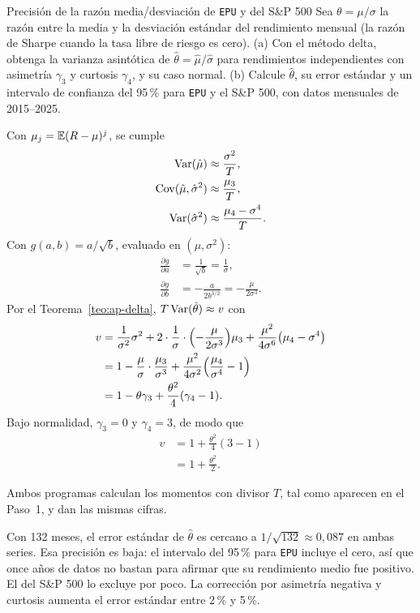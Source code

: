 \begin{ejresuelto}{Precisión de la razón media/desviación de \texttt{EPU} y del S\&P 500}\label{ej:apdelta}
\enunciado Sea $\theta=\mu/\sigma$ la razón entre la media y la desviación estándar del rendimiento
mensual (la razón de Sharpe cuando la tasa libre de riesgo es cero). (a) Con el método delta, obtenga la
varianza asintótica de $\hat\theta=\hat\mu/\hat\sigma$ para rendimientos independientes con asimetría
$\gamma_3$ y curtosis $\gamma_4$, y su caso normal. (b) Calcule $\hat\theta$, su error estándar y un
intervalo de confianza del 95\,\% para \texttt{EPU} y el S\&P 500, con datos mensuales de 2015--2025.

\solucion
{} Con $\mu_j=\mathbb{E}(R-\mu)^j$, se cumple
\begin{align*}
  \operatorname{Var}(\hat\mu)          &\approx \frac{\sigma^2}{T},\\
  \operatorname{Cov}(\hat\mu,\hat\sigma^2) &\approx \frac{\mu_3}{T},\\
  \operatorname{Var}(\hat\sigma^2)     &\approx \frac{\mu_4-\sigma^4}{T}.
\end{align*}
 Con $g(a,b)=a/\sqrt b$, evaluado en $(\mu,\sigma^2)$:
\begin{align*}
  \frac{\partial g}{\partial a} &= \frac{1}{\sqrt b}=\frac1\sigma,\\
  \frac{\partial g}{\partial b} &= -\frac{a}{2b^{3/2}}=-\frac{\mu}{2\sigma^3}.
\end{align*}
 Por el Teorema~\ref{teo:ap-delta}, $T\operatorname{Var}(\hat\theta)\approx v$ con
\begin{align*}
  v &= \frac{1}{\sigma^2}\sigma^2+2\cdot\frac1\sigma\cdot\Bigl(-\frac{\mu}{2\sigma^3}\Bigr)\mu_3
       +\frac{\mu^2}{4\sigma^6}\bigl(\mu_4-\sigma^4\bigr)\\
    &= 1-\frac{\mu}{\sigma}\cdot\frac{\mu_3}{\sigma^3}+\frac{\mu^2}{4\sigma^2}\Bigl(\frac{\mu_4}{\sigma^4}-1\Bigr)\\
    &= 1-\theta\gamma_3+\frac{\theta^2}{4}(\gamma_4-1).
\end{align*}
Bajo normalidad, $\gamma_3=0$ y $\gamma_4=3$, de modo que
\begin{align*}
  v &= 1+\frac{\theta^2}{4}(3-1)\\
    &= 1+\frac{\theta^2}{2}.
\end{align*}


\RvsPy Ambos programas calculan los momentos con divisor $T$, tal como aparecen en el Paso~1, y dan
las mismas cifras.

\begin{conclusion}
Con 132 meses, el error estándar de $\hat\theta$ es cercano a $1/\sqrt{132}\approx0{,}087$ en ambas
series. Esa precisión es baja: el intervalo del 95\,\% para \texttt{EPU} incluye el cero, así que once años
de datos no bastan para afirmar que su rendimiento medio fue positivo. El del S\&P 500 lo excluye por
poco. La corrección por asimetría negativa y curtosis aumenta el error estándar entre 2\,\% y 5\,\%.
\end{conclusion}
\end{ejresuelto}

